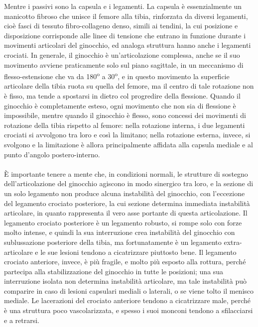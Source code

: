 Mentre i passivi sono la capsula e i legamenti. La capsula è essenzialmente un manicotto fibroso che unisce il femore alla tibia, rinforzata da diversi legamenti, cioè fasci di tessuto fibro-collageno denso, simili ai tendini, la cui posizione e disposizione corrisponde alle linee di tensione che entrano in funzione durante i movimenti articolari del ginocchio, ed analoga struttura hanno anche i legamenti crociati. In generale, il ginocchio è un'articolazione complessa, anche se il suo movimento avviene praticamente solo sul piano sagittale, in un meccanismo di flesso-estensione che va da 180\textsuperscript{o} a 30\textsuperscript{o}, e in questo movimento la superficie articolare della tibia ruota su quella del femore, ma il centro di tale rotazione non è fisso, ma tende a spostarsi in dietro col progredire della flessione. Quando il ginocchio è completamente esteso, ogni movimento che non sia di flessione è impossibile, mentre quando il ginocchio è flesso, sono concessi dei movimenti di rotazione della tibia rispetto al femore: nella rotazione interna, i due legamenti crociati si avvolgono tra loro e così la limitano; nella rotazione esterna, invece, si svolgono e la limitazione è allora principalmente affidata alla capsula mediale e al punto d'angolo postero-interno.
\\\\
È importante tenere a mente che, in condizioni normali, le strutture di sostegno dell'articolazione del ginocchio agiscono in modo sinergico tra loro, e la sezione di un solo legamento non produce alcuna instabilità del ginocchio, con l'eccezione del legamento crociato posteriore, la cui sezione determina immediata instabilità articolare, in quanto rappresenta il vero asse portante di questa articolazione. Il legamento crociato posteriore è un legamento robusto, si rompe solo con forze molto intense, e quindi la sua interruzione crea instabilità del ginocchio con sublussazione posteriore della tibia, ma fortunatamente è un legamento extra-articolare e le sue lesioni tendono a cicatrizzare piuttosto bene. Il legamento crociato anteriore, invece, è più fragile, e molto più esposto alla rottura, perché partecipa alla stabilizzazione del ginocchio in tutte le posizioni; una sua interruzione isolata non determina instabilità articolare, ma tale instabilità può comparire in caso di lesioni capsulari mediali o laterali, o se viene tolto il menisco mediale. Le lacerazioni del crociato anteriore tendono a cicatrizzare male, perché è una struttura poco vascolarizzata, e spesso i suoi monconi tendono a sfilacciarsi e a retrarsi.

